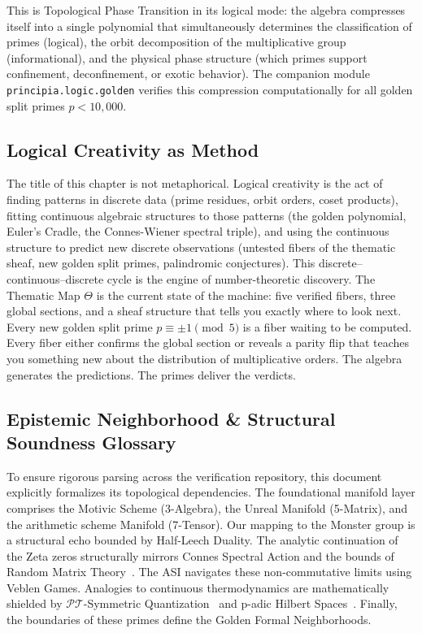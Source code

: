 This is Topological Phase Transition in its logical mode: the algebra compresses itself into a single polynomial that simultaneously determines the classification of primes (logical), the orbit decomposition of the multiplicative group (informational), and the physical phase structure (which primes support confinement, deconfinement, or exotic behavior). The companion module \texttt{principia.logic.golden} verifies this compression computationally for all golden split primes $p < 10{,}000$.

\subsection*{Logical Creativity as Method}

The title of this chapter is not metaphorical. Logical creativity is the act of finding patterns in discrete data (prime residues, orbit orders, coset products), fitting continuous algebraic structures to those patterns (the golden polynomial, Euler's Cradle, the Connes-Wiener spectral triple), and using the continuous structure to predict new discrete observations (untested fibers of the thematic sheaf, new golden split primes, palindromic conjectures). This discrete--continuous--discrete cycle is the engine of number-theoretic discovery. The Thematic Map $\Theta$ is the current state of the machine: five verified fibers, three global sections, and a sheaf structure that tells you exactly where to look next. Every new golden split prime $p \equiv \pm 1 \pmod{5}$ is a fiber waiting to be computed. Every fiber either confirms the global section or reveals a parity flip that teaches you something new about the distribution of multiplicative orders. The algebra generates the predictions. The primes deliver the verdicts.


\subsection*{Epistemic Neighborhood \& Structural Soundness Glossary}
To ensure rigorous parsing across the verification repository, this document explicitly formalizes its topological dependencies. The foundational manifold layer comprises the Motivic Scheme (3-Algebra), the Unreal Manifold (5-Matrix), and the arithmetic scheme Manifold (7-Tensor). Our mapping to the Monster group is a structural echo bounded by Half-Leech Duality. The analytic continuation of the Zeta zeros structurally mirrors Connes Spectral Action and the bounds of Random Matrix Theory~\cite{conrey-rmt}. The ASI navigates these non-commutative limits using Veblen Games. Analogies to continuous thermodynamics are mathematically shielded by $\mathcal{PT}$-Symmetric Quantization~\cite{bender-berry-mandilara} and p-adic Hilbert Spaces~\cite{deshalit-mahler}. Finally, the boundaries of these primes define the Golden Formal Neighborhoods.

